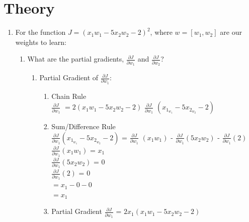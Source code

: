 \documentclass[12pt]{article}
\begin{document}
\maketitle

\section{Theory}
\begin{enumerate}
\item For the function $J=(x_1 w_1 -5x_2 w_2-2)^2$, where $w=[w_1, w_2]$ are our weights to learn:
    \begin{enumerate}
    \item What are the partial gradients, $\frac{\partial J}{\partial w_1}$ and $\frac{\partial J}{\partial w_2}$?
        \begin{enumerate}
            \item Partial Gradient of $\frac{\partial J}{\partial w_1}$:
            \begin{enumerate}
            \item Chain Rule\\
            $\frac{\partial J}{\partial w_1}$ $=2(x_1w_1 - 5x_2w_2-2)$ $\frac{\partial J}{\partial w_1}$ $(x_1_w_1 - 5x_2_w_2 -2)$ 
            \item Sum/Difference Rule\\
            $\frac{\partial J}{\partial w_1}$$(x_1_w_1 - 5x_2_w_2 -2)$ = $\frac{\partial J}{\partial w_1}$ $(x_1w_1)$ - $\frac{\partial J}{\partial w_1}$$(5x_2w_2)$ - $\frac{\partial J}{\partial w_1}$$(2)$ \\
            $\frac{\partial J}{\partial w_1}$$(x_1w_1)$ = $x_1$ \\
            $\frac{\partial J}{\partial w_1}$$(5x_2w_2)$ = $0$ \\
            $\frac{\partial J}{\partial w_1}$$(2)$ = $0$ \\
            $= x_1 - 0 - 0$ \\
            $= x_1$
            \item Partial Gradient
            $\frac{\partial J}{\partial w_1}$ = $2x_1(x_1w_1 - 5x_2w_2 -2)$
            \end{enumerate}
        \end{enumerate}
        

\end{enumerate}
\end{enumerate}
\end{document}
